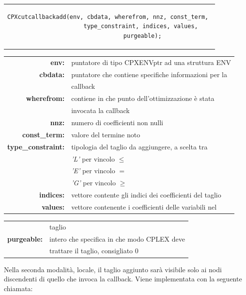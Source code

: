 \begin{center}
\begin{tabular}{c}
\begin{lstlisting}[linewidth=350pt, basicstyle=\footnotesize\sffamily,]  
CPXcutcallbackadd(env, cbdata, wherefrom, nnz, const_term, 
                   type_constraint, indices, values, 
                   purgeable);
\end{lstlisting}
\end{tabular}
\end{center}
\begin{table}[h]
\centering
\begin{tabular}{rl}
\textbf{env:} & {puntatore di tipo CPXENVptr ad una struttura ENV}\\
\textbf{cbdata:} & {puntatore che contiene specifiche informazioni per la}\\
&{callback}\\
\textbf{wherefrom:} & {contiene in che punto dell'ottimizzazione è stata} \\ 
&{invocata la callback}\\
\textbf{nnz:} & {numero di coefficienti non nulli} \\
\textbf{const\_term:} & {valore del termine noto} \\
\textbf{type\_constraint:} & {tipologia del taglio da aggiungere, a scelta tra} \\
&{\textit{'L'} per vincolo $\leq$}\\
&{\textit{'E'} per vincolo $=$}\\
&{\textit{'G'} per vincolo $\geq$}\\
\textbf{indices:} & {vettore contente gli indici dei coefficienti del taglio} \\
\textbf{values:} & {vettore contenente i coefficienti delle variabili nel} \\
\end{tabular}
\end{table} 
\begin{table}[h]
\centering
\begin{tabular}{rl}
&{taglio}\\
\textbf{purgeable:} & {intero che specifica in che modo CPLEX deve } \\
&{trattare il taglio, consigliato 0}\\
\end{tabular}
\end{table}
Nella seconda modalità, locale, il taglio aggiunto sarà visibile solo ai nodi discendenti di quello che invoca la callback. Viene implementata con la seguente chiamata:
